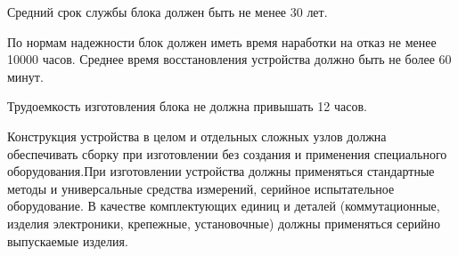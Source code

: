 Средний срок службы блока должен быть не менее 30 лет.

По нормам надежности блок должен иметь время наработки на отказ
не менее 10000 часов. Среднее время восстановления
устройства должно быть не более 60 минут.

Трудоемкость изготовления блока не должна привышать 12 часов.

Конструкция устройства в целом и отдельных сложных узлов должна
обеспечивать сборку при изготовлении без создания и применения
специального оборудования.При изготовлении устройства должны
применяться стандартные методы и универсальные средства измерений,
серийное испытательное оборудование. В качестве комплектующих единиц и
деталей (коммутационные, изделия электроники, крепежные, установочные)
должны применяться серийно выпускаемые изделия.

\newpage
